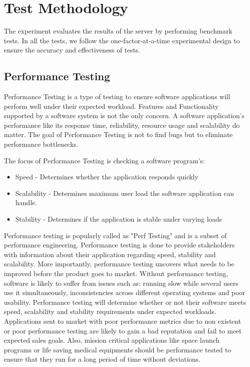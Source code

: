 \documentclass[../thesis.tex]{subfiles}
\begin{document}
	\section{Test Methodology}
	The experiment evaluates the results of the server by performing benchmark tests. In all the tests, we follow the one-factor-at-a-time experimental design \cite{oaat} to ensure the accuracy and effectiveness of tests.
	
	\subsection{Performance Testing}
	Performance Testing is a type of testing to ensure software applications will perform well under their expected workload. Features and Functionality supported by a software system is not the only concern. A software application's performance like its response time, reliability, resource usage and scalability do matter. The goal of Performance Testing is not to find bugs but to eliminate performance bottlenecks.
	\newline

	The focus of Performance Testing is checking a software program's:
 
	\begin{itemize}
		\item Speed - Determines whether the application responds quickly

		\item Scalability - Determines maximum user load the software application can handle.

		\item Stability - Determines if the application is stable under varying loads
	\end{itemize}

	Performance testing is popularly called as "Perf Testing" and is a subset of performance engineering. Performance testing is done to provide stakeholders with information about their application regarding speed, stability and scalability. More importantly, performance testing uncovers what needs to be improved before the product goes to market. Without performance testing, software is likely to suffer from issues such as: running slow while several users use it simultaneously, inconsistencies across different operating systems and poor usability. Performance testing will determine whether or not their software meets speed, scalability and stability requirements under expected workloads. Applications sent to market with poor performance metrics due to non existent or poor performance testing are likely to gain a bad reputation and fail to meet expected sales goals. Also, mission critical applications like space launch programs or life saving medical equipments should be performance tested to ensure that they run for a long period of time without deviations.
\end{document}
